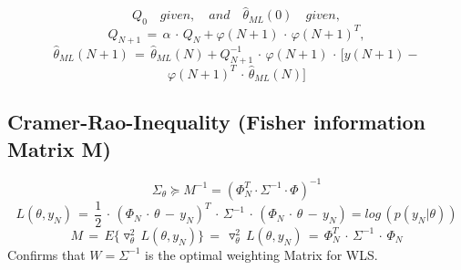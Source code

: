 \begin{equation*}
Q_{ 0 }\quad given,\quad and\quad \hat { \theta  } _{ ML }(0)\quad given,
\end{equation*}
\begin{equation*}
Q_{ N+1 }\, =\, \alpha \, \cdot \, Q_{ N }+\varphi (N+1)\, \cdot \, \varphi (N+1)^{ T },
\end{equation*}
\begin{equation*}
\hat { \theta  } _{ ML }(N+1)\, =\, \hat { \theta  } _{ ML }(N)+Q_{ N+1 }^{ -1 }\, \cdot \, \varphi (N+1)\, \cdot \, [y(N+1)-
\end{equation*}
\begin{equation*}
\varphi(N+1)^T \, \cdot \,\hat{\theta}_{ML}(N)]
\end{equation*}

\subsection*{Cramer-Rao-Inequality (Fisher information Matrix M)}
\begin{equation*}
{ \Sigma  }_{ \theta  } \succeq M^{-1} = (\Phi^T_N \cdot \Sigma^{-1} \cdot \Phi)^{-1}
\end{equation*}
\begin{equation*}
L(\theta ,y_{ N })\, =\, \frac { 1 }{ 2 } \, \cdot \, (\Phi _{ N }\, \cdot \, \theta \, -\, y_N)^{ T } \, \cdot \, \Sigma^{-1} \, \cdot \,  (\Phi_N \, \cdot \, \theta \, - \, y_N) =log\, (p({ y }_{ N }|\theta))
\end{equation*}
\begin{equation*}
M\, =\, { E }\{ \triangledown ^{ 2 }_{ \theta  }\, L(\theta ,y_{ N })\} \, =\, \triangledown ^{ 2 }_{ \theta  }\, L(\theta ,y_{ N })\, =\, \Phi _{ N }^{ T }\, \cdot \, \Sigma ^{ -1 }\, \cdot \, \Phi _{ N }
\end{equation*}
Confirms that $W = \Sigma^{-1}$ is the optimal weighting Matrix for WLS.